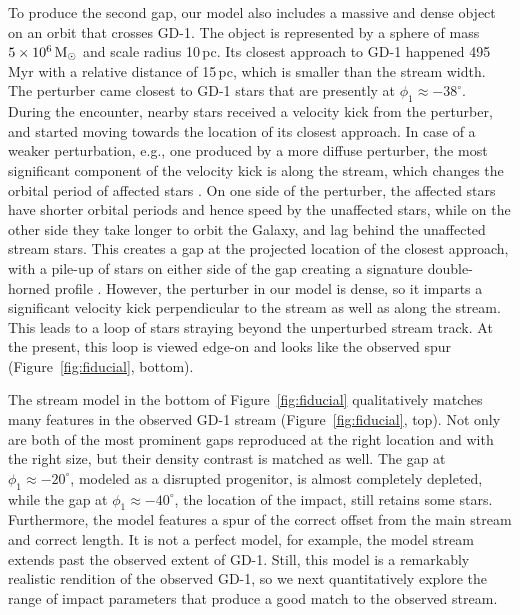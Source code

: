\documentclass[twocolumn]{aastex62}
\begin{document}
To produce the second gap, our model also includes a massive and dense object on an orbit that crosses GD-1.
The object is represented by a \citet{hernquist1990} sphere of mass $5\times10^6\rm\,M_\odot$ and scale radius 10\,pc.
Its closest approach to GD-1 happened 495\,Myr with a relative distance of 15\,pc, which is smaller than the stream width.
The perturber came closest to GD-1 stars that are presently at $\phi_1\approx-38^\circ$.
During the encounter, nearby stars received a velocity kick from the perturber, and started moving towards the location of its closest approach.
In case of a weaker perturbation, e.g., one produced by a more diffuse perturber, the most significant component of the velocity kick is along the stream, which changes the orbital period of affected stars \citep{eb2015}.
On one side of the perturber, the affected stars have shorter orbital periods and hence speed by the unaffected stars, while on the other side they take longer to orbit the Galaxy, and lag behind the unaffected stream stars.
This creates a gap at the projected location of the closest approach, with a pile-up of stars on either side of the gap creating a signature double-horned profile \citep{carlberg2012}.
However, the perturber in our model is dense, so it imparts a significant velocity kick perpendicular to the stream as well as along the stream.
This leads to a loop of stars straying beyond the unperturbed stream track.
At the present, this loop is viewed edge-on and looks like the observed spur (Figure~\ref{fig:fiducial}, bottom).

The stream model in the bottom of Figure~\ref{fig:fiducial} qualitatively matches many features in the observed GD-1 stream (Figure~\ref{fig:fiducial}, top).
Not only are both of the most prominent gaps reproduced at the right location and with the right size, but their density contrast is matched as well.
The gap at $\phi_1\approx-20^\circ$, modeled as a disrupted progenitor, is almost completely depleted, while the gap at $\phi_1\approx-40^\circ$, the location of the impact, still retains some stars.
Furthermore, the model features a spur of the correct offset from the main stream and correct length.
It is not a perfect model, for example, the model stream extends past the observed extent of GD-1.
Still, this model is a remarkably realistic rendition of the observed GD-1, so we next quantitatively explore the range of impact parameters that produce a good match to the observed stream.
\end{document}
